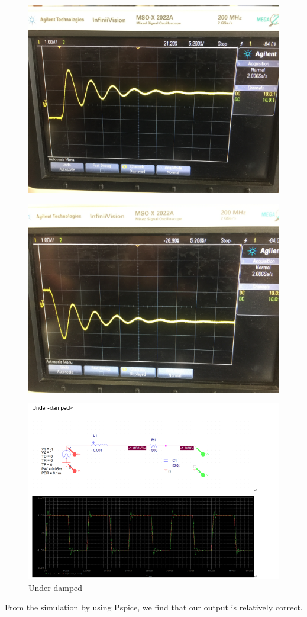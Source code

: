 \documentclass{article}
\begin{document}
\begin{figure}[H]
	\centering
	\includegraphics[width=0.7\linewidth]{IMG_6444}
	\label{fig:img6444}
\end{figure}
\begin{figure}[H]
	\centering
	\includegraphics[width=0.7\linewidth]{IMG_6445}
	\label{fig:img6445}
\end{figure}
\begin{figure}[H]
	\centering
	\includegraphics[width=0.7\linewidth]{p1}
	\caption{Under-damped}
	\label{fig:p1}
\end{figure}
From the simulation by using Pspice, we find that our output is relatively correct.
\end{document}
